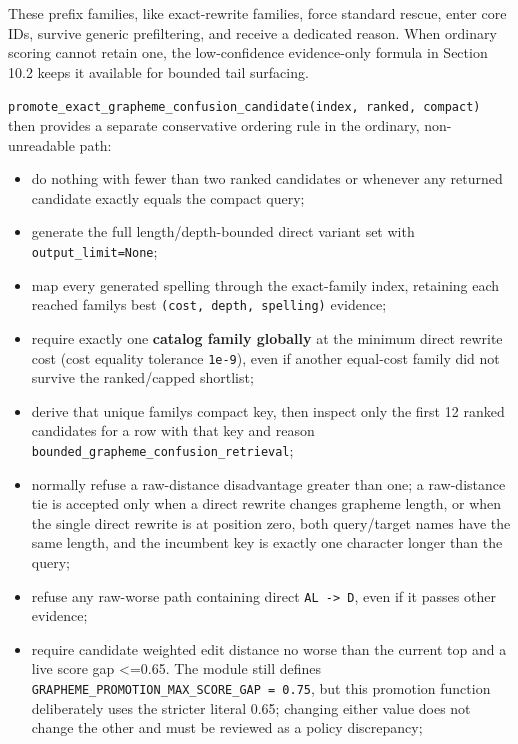 These prefix families, like exact-rewrite families, force standard rescue, enter core IDs, survive generic prefiltering, and receive a dedicated reason. When ordinary scoring cannot retain one, the low-confidence evidence-only formula in Section 10.2 keeps it available for bounded tail surfacing.

\texttt{promote\_\allowbreak{}exact\_\allowbreak{}grapheme\_\allowbreak{}confusion\_\allowbreak{}candidate(index,\ ranked,\ compact)} then provides a separate conservative ordering rule in the ordinary, non-unreadable path:

\begin{itemize}
\tightlist
\item
  do nothing with fewer than two ranked candidates or whenever any returned candidate exactly equals the compact query;
\item
  generate the full length/depth-bounded direct variant set with \texttt{output\_\allowbreak{}limit=None};
\item
  map every generated spelling through the exact-family index, retaining each reached family\textquotesingle s best \texttt{(cost,\ depth,\ spelling)} evidence;
\item
  require exactly one \textbf{catalog family globally} at the minimum direct rewrite cost (cost equality tolerance \texttt{1e-9}), even if another equal-cost family did not survive the ranked/capped shortlist;
\item
  derive that unique family\textquotesingle s compact key, then inspect only the first 12 ranked candidates for a row with that key and reason \texttt{bounded\_\allowbreak{}grapheme\_\allowbreak{}confusion\_\allowbreak{}retrieval};
\item
  normally refuse a raw-distance disadvantage greater than one; a raw-distance tie is accepted only when a direct rewrite changes grapheme length, or when the single direct rewrite is at position zero, both query/target names have the same length, and the incumbent key is exactly one character longer than the query;
\item
  refuse any raw-worse path containing direct \texttt{AL\ -\textgreater{}\ D}, even if it passes other evidence;
\item
  require candidate weighted edit distance no worse than the current top and a live score gap \textless=0.65. The module still defines \texttt{GRAPHEME\_\allowbreak{}PROMOTION\_\allowbreak{}MAX\_\allowbreak{}SCORE\_\allowbreak{}GAP\ =\ 0.75}, but this promotion function deliberately uses the stricter literal 0.65; changing either value does not change the other and must be reviewed as a policy discrepancy;

\end{itemize}
